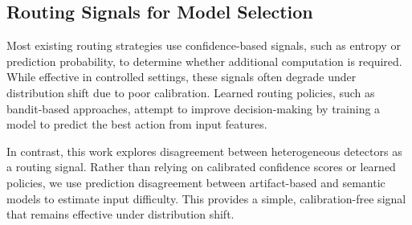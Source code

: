 \documentclass{ieeeaccess}
\begin{document}
\subsection{Routing Signals for Model Selection}

Most existing routing strategies use confidence-based signals, such as entropy or prediction probability, to determine whether additional computation is required. While effective in controlled settings, these signals often degrade under distribution shift due to poor calibration. Learned routing policies, such as bandit-based approaches, attempt to improve decision-making by training a model to predict the best action
from input features.

In contrast, this work explores disagreement between heterogeneous detectors as a routing signal. Rather than relying on calibrated confidence scores or learned policies, we use prediction disagreement between artifact-based and semantic models to estimate input difficulty. This provides a simple, calibration-free signal that remains effective under distribution shift.
\end{document}
